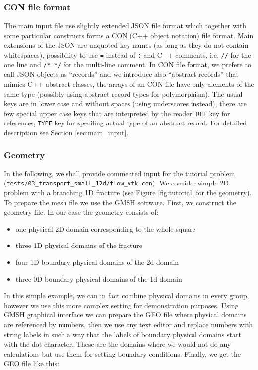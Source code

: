 \documentclass[12pt,a4paper]{report}
\begin{document}
\subsubsection{CON file format}
The main input file use slightly extended JSON file format which together with some particular constructs forms a CON (C++ object notation) file format. 
Main extensions of the JSON are unquoted key names (as long as they do not contain whitespaces), possibility to use \verb'=' instead of \verb':' 
and C++ comments, i.e. \verb'//' for the one line and \verb'/* */' for the multi-line comment. In CON file format, we prefere to call JSON objects as ``records'' and we introduce also ``abstract records''
that mimics C++ abstract classes, the arrays of an CON file have only alements of the same type (possibly using abstract record types for polymorphism). 
The usual keys are in lower case and without spaces (using underscores instead),
there are few special upper case keys that are interpreted by the reader: \verb'REF' key for references, \verb'TYPE' key for specifing actual type of an abstract record.
For detailed description see Section \ref{sec:main_input}.

\subsubsection{Geometry}
In the following, we shall provide commented input for the tutorial problem (\verb'tests/03_transport_small_12d/flow_vtk.con').
We consider simple 2D problem with a branching 1D fracture (see Figure \ref{fig:tutorial} for the geometry). To prepare the mesh file we use the \href{http://geuz.org/gmsh/}{GMSH software}.
First, we construct the geometry file. In our case the geometry consists of: 
\begin{itemize}
 \item one physical 2D domain corresponding to the whole square
 \item three 1D physical domains of the fracture
 \item four 1D boundary physical domains of the 2d domain
 \item three 0D boundary physical domains of the 1d domain
\end{itemize}
In this simple example, we can in fact combine physical domains in every group, however we use this more complex setting for
demonstration purposes. Using GMSH graphical interface we can prepare the GEO file where physical domains are referenced by numbers, then we use 
any text editor and replace numbers with string labels in such a way that the labels of boundary physical domains start with the dot character. 
These are the domains where we would not do any calculations but use them for setting boundary conditions.
Finally, we get the GEO file like this:
\end{document}
